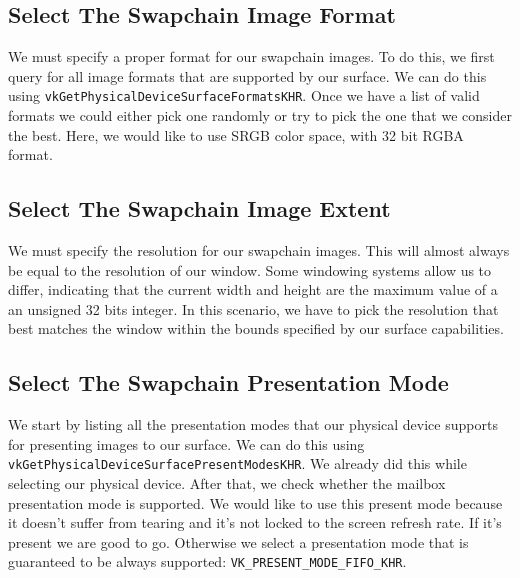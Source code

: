 \subsection{Select The Swapchain Image Format}

We must specify a proper format for our swapchain images.
To do this, we first query for all image formats that are supported by our
surface.
We can do this using \texttt{vkGetPhysicalDeviceSurfaceFormatsKHR}.
Once we have a list of valid formats we could either pick one randomly or
try to pick the one that we consider the best.
Here, we would like to use SRGB color space, with 32 bit RGBA format.

\begin{minipage}{\linewidth}{\noindent}
    
\end{minipage}

\subsection{Select The Swapchain Image Extent}

We must specify the resolution for our swapchain images.
This will almost always be equal to the resolution of our window.
Some windowing systems allow us to differ, indicating that the current
width and height are the maximum value of a an unsigned 32 bits integer.
In this scenario, we have to pick the resolution that best matches the window
within the bounds specified by our surface capabilities.

\begin{minipage}{\linewidth}{\noindent}
    
\end{minipage}

\subsection{Select The Swapchain Presentation Mode}

We start by listing all the presentation modes that our physical device supports
for presenting images to our surface.
We can do this using \texttt{vkGetPhysicalDeviceSurfacePresentModesKHR}.
We already did this while selecting our physical device.
After that, we check whether the mailbox presentation mode is supported.
We would like to use this present mode because it doesn't suffer from
tearing and it's not locked to the screen refresh rate.
If it's present we are good to go.
Otherwise we select a presentation mode that is guaranteed to be always supported:
\texttt{VK\_PRESENT\_MODE\_FIFO\_KHR}.

